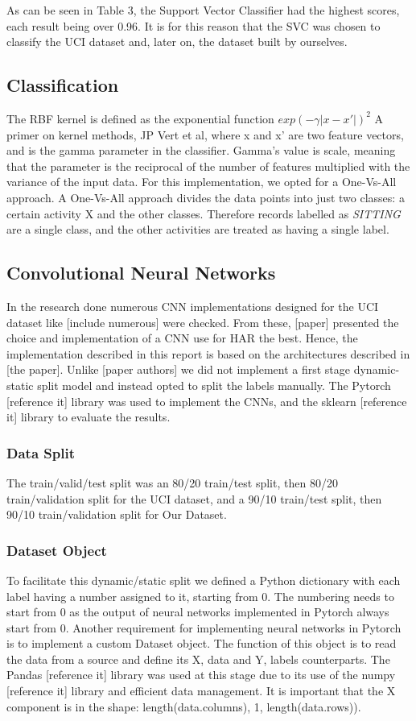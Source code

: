     As can be seen in Table 3, the Support Vector Classifier had the highest scores, each result being over 0.96. It is for this reason that the SVC
    was chosen to classify the UCI dataset \cite{Anguita2013} and, later on, the dataset built by ourselves.

\subsection{Classification}
    The RBF kernel is defined as the exponential function \(exp(-\gamma \lvert x-x' \rvert)^2\) A primer on kernel methods, JP Vert et al, where x and x’ are two feature vectors, and is the
    gamma parameter in the classifier. Gamma’s value is scale, meaning that the parameter is the reciprocal of the number of features multiplied with the variance of the input data.
    For this implementation, we opted for a One-Vs-All approach. A One-Vs-All approach divides the data points into just two classes: a certain activity X and the other classes. Therefore records
    labelled as \emph{SITTING} are a single class, and the other activities are treated as having a single label.

\subsection{Convolutional Neural Networks}
In the research done numerous CNN implementations designed for the UCI dataset like [include numerous] were checked.
From these, [paper] presented the choice and implementation of a CNN use for HAR the best.
Hence, the implementation described in this report is based on the architectures described in [the paper].
Unlike [paper authors] we did not  implement a first stage dynamic-static split model and instead opted to split the labels manually.
The Pytorch [reference it] library was used to implement the CNNs, and the sklearn [reference it] library to evaluate the results.

\subsubsection{Data Split}
The train/valid/test split was an 80/20 train/test split, then 80/20 train/validation split for the UCI dataset, and a 90/10 train/test split, then 90/10 train/validation split for Our Dataset.

\subsubsection{Dataset Object}
To facilitate this dynamic/static split we defined a Python dictionary with each label having a number assigned to it, starting from 0.
The numbering needs to start from 0 as the output of neural networks implemented in Pytorch always start from 0.
Another requirement for implementing neural networks in Pytorch is to implement a custom Dataset object.
The function of this object is to read the data from a source and define its X, data and Y, labels counterparts.
The Pandas [reference it] library was used at this stage due to its use of the numpy [reference it] library and efficient data management.
It is important that the X component is in the shape: length(data.columns), 1, length(data.rows)).

